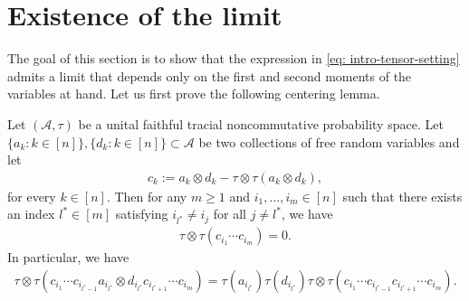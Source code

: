 \documentclass[12pt,reqno]{amsart}
\theoremstyle{plain}
\newcommand{\1}{\mathbf{1}}
\newcommand{\A}{\mathcal{A}}
\begin{document}


\section{Existence of the limit}\label{sec: existence}

The goal of this section is to show that the expression in \eqref{eq: intro-tensor-setting} admits a limit that depends only on the first and second moments of the variables at hand. 
Let us first prove the following centering lemma.
\begin{lemma}\label{lemma: centering}
    Let $(\A,\tau)$ be a unital faithful tracial noncommutative probability space. Let $\{a_k: k \in [n]\},\{d_k: k \in [n]\} \subset \A$ be two collections of free random variables and let
    \begin{align*}
        c_k:=a_k\otimes d_k-\tau\otimes \tau(a_k\otimes d_k),
    \end{align*}
    for every $k\in[n]$. Then for any $m \ge 1$ and $i_1,\ldots,i_m \in [n]$ such that there exists an index $l^* \in [m]$ satisfying $i_{l^*} \ne i_j$ for all $j \ne l^*$, we have
    \begin{align*}
        \tau\otimes \tau(c_{i_1}\cdots c_{i_{m}})=0.
    \end{align*}
    In particular, we have
    \begin{align*}
        \tau\otimes \tau\left(c_{i_1}\cdots c_{i_{l^*-1}}a_{i_{l^*}}\otimes d_{i_{l^*}} c_{i_{l^*+1}}\cdots c_{i_m} \right)=\tau(a_{i_{l^*}})\tau(d_{i_{l^*}})\tau\otimes \tau(c_{i_1}\cdots c_{i_{l^*-1}} c_{i_{l^*+1}}\cdots c_{i_m}).
    \end{align*}
\end{lemma}
\end{document}
